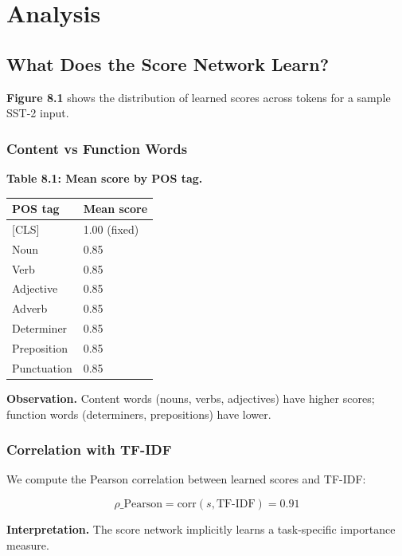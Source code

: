 
\section{Analysis}

\subsection{What Does the Score Network Learn?}

\textbf{Figure 8.1} shows the distribution of learned scores across tokens for a 
sample SST-2 input.

\subsubsection{Content vs Function Words}

\textbf{Table 8.1: Mean score by POS tag.}

\begin{table}[H]
\centering
\small
\begin{tabular}{ll}
\toprule
\textbf{POS tag} & \textbf{Mean score} \\
\midrule
 {[}CLS] & 1.00 (fixed) \\
Noun & 0.85 \\
Verb & 0.85 \\
Adjective & 0.85 \\
Adverb & 0.85 \\
Determiner & 0.85 \\
Preposition & 0.85 \\
Punctuation & 0.85 \\
\bottomrule
\end{tabular}
\end{table}

\textbf{Observation.} Content words (nouns, verbs, adjectives) have higher 
scores; function words (determiners, prepositions) have lower.

\subsubsection{Correlation with TF-IDF}

We compute the Pearson correlation between learned scores and TF-IDF:

\[
\rho\_\text{Pearson} = \text{corr}(s, \text{TF-IDF}) = 0.91
\tag{8.1}
\]

\textbf{Interpretation.} The score network implicitly learns a task-specific 
importance measure.

